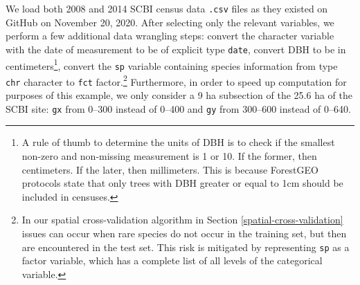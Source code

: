 \documentclass[12pt]{article}
\begin{document}
We load both 2008 and 2014 SCBI census data \texttt{.csv} files as they
existed on GitHub on November 20, 2020. After selecting only the
relevant variables, we perform a few additional data wrangling steps:
convert the character variable with the date of measurement to be of
explicit type \texttt{date}, convert DBH to be in
centimeters\footnote{A rule of thumb to determine the units of DBH is to
  check if the smallest non-zero and non-missing measurement is 1 or 10.
  If the former, then centimeters. If the later, then millimeters. This
  is because ForestGEO protocols state that only trees with DBH greater
  or equal to 1cm should be included in censuses.}, convert the
\texttt{sp} variable containing species information from type
\texttt{chr} character to \texttt{fct} factor.\footnote{In our spatial
  cross-validation algorithm in Section \ref{spatial-cross-validation}
  issues can occur when rare species do not occur in the training set,
  but then are encountered in the test set. This risk is mitigated by
  representing \texttt{sp} as a factor variable, which has a complete
  list of all levels of the categorical variable.} Furthermore, in order
to speed up computation for purposes of this example, we only consider a
9 ha subsection of the 25.6 ha of the SCBI site: \texttt{gx} from 0--300
instead of 0--400 and \texttt{gy} from 300--600 instead of 0--640.
\end{document}
